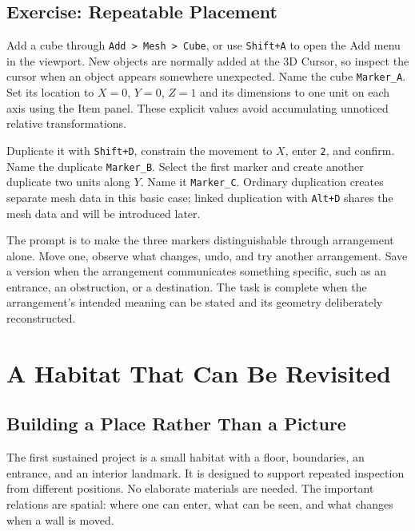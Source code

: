 \documentclass[11pt,openany]{book}
\newcommand{\key}[1]{\texttt{#1}}
\newcommand{\obj}[1]{\texttt{#1}}
\begin{document}
\section{Exercise: Repeatable Placement}

\begin{exercise}
Add a cube through \texttt{Add > Mesh > Cube}, or use \key{Shift+A} to open the Add menu in the viewport. New objects are normally added at the 3D Cursor, so inspect the cursor when an object appears somewhere unexpected. Name the cube \obj{Marker\_A}. Set its location to $X=0$, $Y=0$, $Z=1$ and its dimensions to one unit on each axis using the Item panel. These explicit values avoid accumulating unnoticed relative transformations.

Duplicate it with \key{Shift+D}, constrain the movement to $X$, enter \texttt{2}, and confirm. Name the duplicate \obj{Marker\_B}. Select the first marker and create another duplicate two units along $Y$. Name it \obj{Marker\_C}. Ordinary duplication creates separate mesh data in this basic case; linked duplication with \key{Alt+D} shares the mesh data and will be introduced later.

The prompt is to make the three markers distinguishable through arrangement alone. Move one, observe what changes, undo, and try another arrangement. Save a version when the arrangement communicates something specific, such as an entrance, an obstruction, or a destination. The task is complete when the arrangement's intended meaning can be stated and its geometry deliberately reconstructed.
\end{exercise}



\chapter{A Habitat That Can Be Revisited}

\section{Building a Place Rather Than a Picture}

The first sustained project is a small habitat with a floor, boundaries, an entrance, and an interior landmark. It is designed to support repeated inspection from different positions. No elaborate materials are needed. The important relations are spatial: where one can enter, what can be seen, and what changes when a wall is moved.
\end{document}
